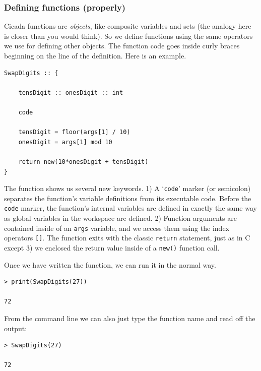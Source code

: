 \documentclass{article}
\newenvironment{code}{
       \begin{list}{}{
               \setlength{\leftmargin}{.4in}
               \setlength{\rightmargin}{0in}
               \setlength{\topsep}{.2in}
       }
       \small
       \item[] }
       { \end{list}   }
\begin{document}
\subsubsection{Defining functions (properly)}

Cicada functions are \emph{objects}, like composite variables and sets (the analogy here is closer than you would think).  So we define functions using the same operators we use for defining other objects.  The function code goes inside curly braces beginning on the line of the definition.  Here is an example.

\begin{code} \begin{verbatim}
SwapDigits :: {
    
    tensDigit :: onesDigit :: int
    
    code
    
    tensDigit = floor(args[1] / 10)
    onesDigit = args[1] mod 10
    
    return new(10*onesDigit + tensDigit)
}
\end{verbatim} \end{code}

\noindent The function shows us several new keywords.  1) A `\texttt{code}' marker (or semicolon) separates the function's variable definitions from its executable code.  Before the \verb#code# marker, the function's internal variables are defined in exactly the same way as global variables in the workspace are defined.  2) Function arguments are contained inside of an \texttt{args} variable, and we access them using the index operators \verb#[]#.  The function exits with the classic \texttt{return} statement, just as in C except 3) we enclosed the return value inside of a \verb#new()# function call.

Once we have written the function, we can run it in the normal way.

\begin{code} \begin{verbatim}
> print(SwapDigits(27))

72
\end{verbatim} \end{code}

\noindent From the command line we can also just type the function name and read off the output:

\begin{code} \begin{verbatim}
> SwapDigits(27)

72
\end{verbatim} \end{code}
\end{document}
